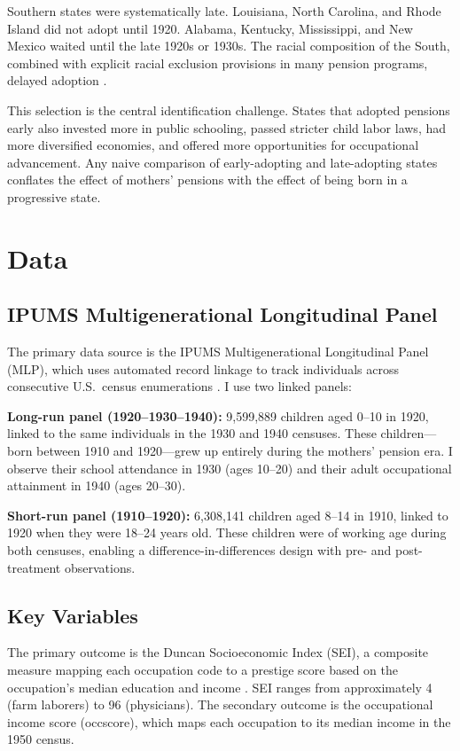 \documentclass[12pt]{article}
\begin{document}
Southern states were systematically late. Louisiana, North Carolina, and Rhode Island did not adopt until 1920. Alabama, Kentucky, Mississippi, and New Mexico waited until the late 1920s or 1930s. The racial composition of the South, combined with explicit racial exclusion provisions in many pension programs, delayed adoption \citep{skocpol1992}.

This selection is the central identification challenge. States that adopted pensions early also invested more in public schooling, passed stricter child labor laws, had more diversified economies, and offered more opportunities for occupational advancement. Any naive comparison of early-adopting and late-adopting states conflates the effect of mothers' pensions with the effect of being born in a progressive state.


\section{Data}

\subsection{IPUMS Multigenerational Longitudinal Panel}

The primary data source is the IPUMS Multigenerational Longitudinal Panel (MLP), which uses automated record linkage to track individuals across consecutive U.S.\ census enumerations \citep{abramitzky2021, ruggles2021}. I use two linked panels:

\textbf{Long-run panel (1920--1930--1940):} 9,599,889 children aged 0--10 in 1920, linked to the same individuals in the 1930 and 1940 censuses. These children---born between 1910 and 1920---grew up entirely during the mothers' pension era. I observe their school attendance in 1930 (ages 10--20) and their adult occupational attainment in 1940 (ages 20--30).

\textbf{Short-run panel (1910--1920):} 6,308,141 children aged 8--14 in 1910, linked to 1920 when they were 18--24 years old. These children were of working age during both censuses, enabling a difference-in-differences design with pre- and post-treatment observations.

\subsection{Key Variables}

The primary outcome is the Duncan Socioeconomic Index (SEI), a composite measure mapping each occupation code to a prestige score based on the occupation's median education and income \citep{duncan1961}. SEI ranges from approximately 4 (farm laborers) to 96 (physicians). The secondary outcome is the occupational income score (occscore), which maps each occupation to its median income in the 1950 census.
\end{document}
